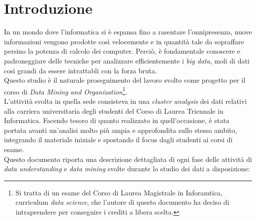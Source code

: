 \chapter{Introduzione}
\label{ch:intro}

In un mondo dove l'informatica si è espansa fino a rasentare l'onnipresenza, nuove informazioni vengono prodotte così velocemente e in quantità tale da sopraffare persino la potenza di calcolo dei computer. Perciò, è fondamentale conoscere e padroneggiare delle tecniche per analizzare efficientemente i \textit{big data}, moli di dati così grandi da essere intrattabli con la forza bruta. \\

Questo studio è il naturale proseguimento del lavoro svolto come progetto per il corso di \textit{Data Mining and Organization}\footnote{Si tratta di un esame del Corso di Laurea Magistrale in Inforamtica, curriculum \textit{data science}, che l'autore di questo documento ha deciso di intraprendere per conseguire i crediti a libera scelta.}. \\

L'attività svolta in quella sede consisteva in una \textit{cluster analysis} dei dati relativi alla carriera universitaria degli studenti del Corso di Laurea Triennale in Informatica. Facendo tesoro di quanto realizzato in quell'occasione, è stata portata avanti un'analisi molto più ampia e approfondita sullo stesso ambito, integrando il materiale iniziale e spostando il focus dagli studenti ai corsi di esame. \\

Questo documento riporta una descrizione dettagliata di ogni fase delle attività di \textit{data understanding} e \textit{data mining} svolte durante lo studio dei dati a disposizione:

